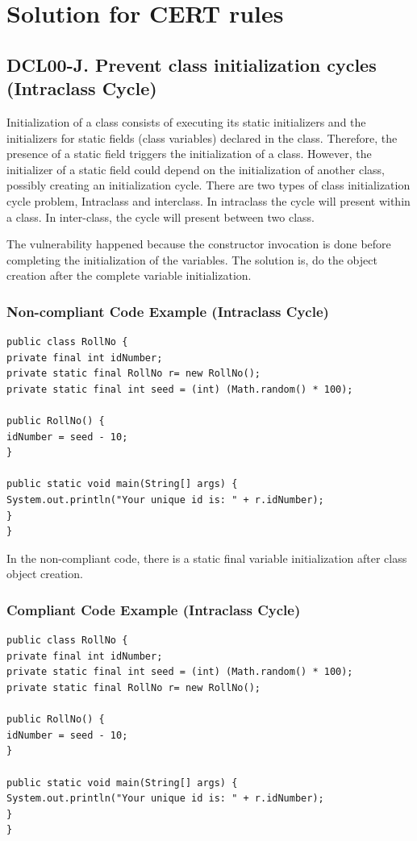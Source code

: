 \section{Solution for CERT rules}

\subsection{DCL00-J. Prevent class initialization cycles  (Intraclass Cycle)}

Initialization of a class consists of executing its static initializers and the initializers for static fields (class variables) declared in the class. Therefore, the presence of a static field triggers the initialization of a class. However, the initializer of a static field could depend on the initialization of another class, possibly creating an initialization cycle\cite{dcl00j}. There are two types of class initialization cycle problem, Intraclass and interclass. In intraclass the cycle will present within a class. In inter-class, the cycle will present between two class. 

The vulnerability  happened because the constructor invocation is done before completing the initialization of the variables. The solution is, do the object creation after the complete variable initialization. 


\subsubsection{Non-compliant Code Example (Intraclass Cycle)}
\begin{lstlisting}
public class RollNo {
private final int idNumber;
private static final RollNo r= new RollNo();
private static final int seed = (int) (Math.random() * 100);  

public RollNo() {
idNumber = seed - 10;  
}

public static void main(String[] args) {
System.out.println("Your unique id is: " + r.idNumber);
}
}
\end{lstlisting}
In the non-compliant code, there is a static final variable initialization after class object creation. 
 
\subsubsection{Compliant Code Example (Intraclass Cycle)}
 
\begin{lstlisting}
public class RollNo {
private final int idNumber;
private static final int seed = (int) (Math.random() * 100);  
private static final RollNo r= new RollNo();

public RollNo() {
idNumber = seed - 10; 
}

public static void main(String[] args) {
System.out.println("Your unique id is: " + r.idNumber);
}
}
\end{lstlisting}
 

